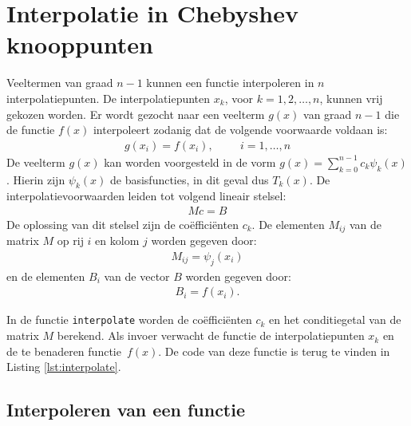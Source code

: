 \documentclass[a4paper, 12pt, titlepage, fleqn]{article}
\begin{document}
\section{Interpolatie in Chebyshev knooppunten}
\label{sec:interpolatie}
Veeltermen van graad $n-1$ kunnen een functie interpoleren in $n$ interpolatiepunten. De interpolatiepunten $x_k$, voor $k = 1,2,\ldots,n$, kunnen vrij gekozen worden. Er wordt gezocht naar een veelterm $g(x)$ van graad $n-1$ die de functie $f(x)$ interpoleert zodanig dat de volgende voorwaarde voldaan is:
\begin{align*}
g(x_i) = f(x_i), \hspace{1cm} i = 1,\ldots,n
\end{align*}
De veelterm $g(x)$ kan worden voorgesteld in de vorm $g(x) = \sum_{k=0}^{n-1}c_k\psi_k(x)$. Hierin zijn $\psi_k(x)$ de basisfuncties, in dit geval dus $T_k(x)$. De interpolatievoorwaarden leiden tot volgend lineair stelsel:
\begin{align}
Mc = B
\label{eq:matrixM}
\end{align}
De oplossing van dit stelsel zijn de co\"effici\"enten $c_k$. De elementen $M_{ij}$ van de matrix $M$ op rij $i$ en kolom $j$ worden gegeven door:
\begin{align*}
M_{ij} = \psi_j(x_i)
\end{align*}
en de elementen $B_i$ van de vector $B$ worden gegeven door:
\begin{align*}
B_i = f(x_i).
\end{align*}

In de functie \texttt{interpolate} worden de co\"effici\"enten $c_k$ en het conditiegetal van de matrix $M$ berekend. Als invoer verwacht de functie de interpolatiepunten $x_k$ en de te benaderen functie~$f(x)$. De code van deze functie is terug te vinden in Listing \ref{lst:interpolate}.



\subsection{Interpoleren van een functie}
\end{document}
